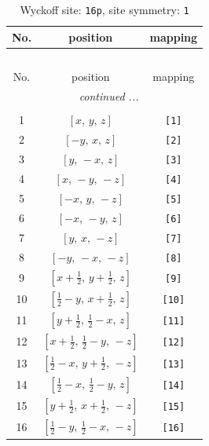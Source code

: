 \documentclass[fleqn,8pt]{jsarticle}
\begin{document}
\begin{longtable}{ccc}
\caption{Wyckoff site: {\tt 16p}, site symmetry: {\tt 1}}
 \\
 \hline \hline
No. & position & mapping \\ \hline \endfirsthead

\multicolumn{2}{l}{\tablename\ \thetable{}} \\
 \hline \hline
No. & position & mapping \\ \hline \endhead

 \hline \hline
\multicolumn{2}{r}{\footnotesize\it continued ...} \\ \endfoot

 \hline \hline
\multicolumn{2}{r}{} \\ \endlastfoot

1 & $\left[ x,\, y,\, z \right]$ & {\tt [1]} \\ \hline
2 & $\left[ - y,\, x,\, z \right]$ & {\tt [2]} \\ \hline
3 & $\left[ y,\, - x,\, z \right]$ & {\tt [3]} \\ \hline
4 & $\left[ x,\, - y,\, - z \right]$ & {\tt [4]} \\ \hline
5 & $\left[ - x,\, y,\, - z \right]$ & {\tt [5]} \\ \hline
6 & $\left[ - x,\, - y,\, z \right]$ & {\tt [6]} \\ \hline
7 & $\left[ y,\, x,\, - z \right]$ & {\tt [7]} \\ \hline
8 & $\left[ - y,\, - x,\, - z \right]$ & {\tt [8]} \\ \hline
9 & $\left[ x + \frac{1}{2},\, y + \frac{1}{2},\, z \right]$ & {\tt [9]} \\ \hline
10 & $\left[ \frac{1}{2} - y,\, x + \frac{1}{2},\, z \right]$ & {\tt [10]} \\ \hline
11 & $\left[ y + \frac{1}{2},\, \frac{1}{2} - x,\, z \right]$ & {\tt [11]} \\ \hline
12 & $\left[ x + \frac{1}{2},\, \frac{1}{2} - y,\, - z \right]$ & {\tt [12]} \\ \hline
13 & $\left[ \frac{1}{2} - x,\, y + \frac{1}{2},\, - z \right]$ & {\tt [13]} \\ \hline
14 & $\left[ \frac{1}{2} - x,\, \frac{1}{2} - y,\, z \right]$ & {\tt [14]} \\ \hline
15 & $\left[ y + \frac{1}{2},\, x + \frac{1}{2},\, - z \right]$ & {\tt [15]} \\ \hline
16 & $\left[ \frac{1}{2} - y,\, \frac{1}{2} - x,\, - z \right]$ & {\tt [16]} \\
\end{longtable}
\end{document}
